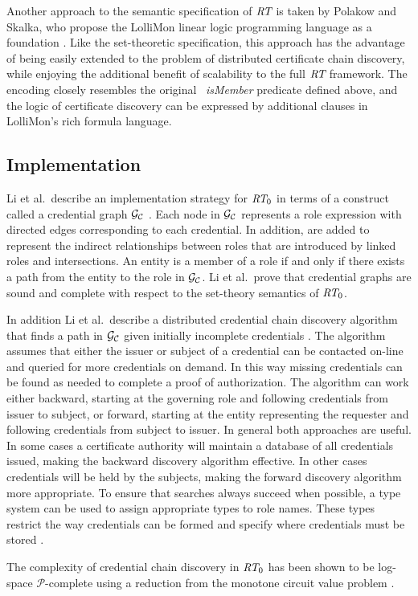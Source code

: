 Another approach to the semantic specification of $\textit{RT}$ is taken by Polakow and Skalka, who
propose the LolliMon linear logic programming language as a foundation
\cite{polakow-skalka-plas06}. Like the set-theoretic specification, this approach has the
advantage of being easily extended to the problem of distributed certificate chain discovery,
while enjoying the additional benefit of scalability to the full $\textit{RT}$ framework. The encoding
closely resembles the original \datalog\ \textit{isMember} predicate defined above, and the
logic of certificate discovery can be expressed by additional clauses in LolliMon's rich formula
language.

\subsection{Implementation}

Li et al.~describe an implementation strategy for $\textit{RT}_0$ in terms of a construct called a
credential graph $\mathcal{G}_{\mathcal{C}}$ \cite{Li:DCDTM}. Each node in $\mathcal{G}_{\mathcal{C}}$
represents a role expression with directed edges corresponding to each credential. In addition,
 are added to represent the indirect relationships between roles that are
introduced by linked roles and intersections. An entity is a member of a role if and only if
there exists a path from the entity to the role in $\mathcal{G}_{\mathcal{C}}$. Li et al.~prove that
credential graphs are sound and complete with respect to the set-theory semantics of $\textit{RT}_0$.

In addition Li et al.~describe a distributed credential chain discovery algorithm that finds a
path in $\mathcal{G}_{\mathcal{C}}$ given initially incomplete credentials \cite{Li:DCDTM}. The
algorithm assumes that either the issuer or subject of a credential can be contacted on-line and
queried for more credentials on demand. In this way missing credentials can be found as needed
to complete a proof of authorization. The algorithm can work either backward, starting at the
governing role and following credentials from issuer to subject, or forward, starting at the
entity representing the requester and following credentials from subject to issuer. In general
both approaches are useful. In some cases a certificate authority will maintain a database of
all credentials issued, making the backward discovery algorithm effective. In other cases
credentials will be held by the subjects, making the forward discovery algorithm more
appropriate. To ensure that searches always succeed when possible, a type system can be used to
assign appropriate types to role names. These types restrict the way credentials can be formed
and specify where credentials must be stored \cite{Li:DCDTM}.

The complexity of credential chain discovery in $\textit{RT}_0$ has been shown to be log-space
$\mathcal{P}$-complete using a reduction from the monotone circuit value problem
\cite{Li:DCDTM}.


